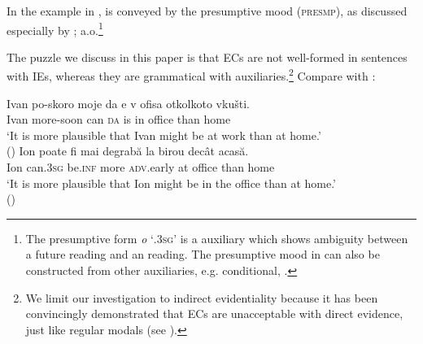 \documentclass[output=paper,colorlinks,citecolor=brown,newtxmath]{langsci/langscibook}
\begin{document}
In the  example in ,  is conveyed by the presumptive mood (\textsc{presmp}), as discussed especially by \citet{slavel56,cos76,reinhrip00,squ01,iri10,iri18}; a.o.\footnote{The  presumptive form \textit{o} `\textsc{.3sg}' is a  auxiliary which shows ambiguity between a  future reading and an  reading. The presumptive mood in  can also be constructed from other  auxiliaries, e.g. conditional, .\label{fn:presmp}}

\largerpage[2]
The puzzle we discuss in this paper is that ECs are not well-formed in sentences with IEs, whereas they are grammatical with  auxiliaries.\footnote{We limit our investigation to indirect evidentiality because it has been convincingly demonstrated that ECs are unacceptable with direct evidence, just like regular  modals (see \citealt{herrub14}).}
Compare  with :

	\ea \label{mobs1}  \label{IllformedECwithIIE}
	\newpage
 \label{IllformedECwithIIERom}
    \z \z

    \ea \label{mobs2} \ea \gll Ivan po-skoro moje da e 	v	ofisa	otkolkoto vkušti.   \\
    Ivan	more-soon
  can \textsc{da} is 	in	office	than home \\
      \glt  `It is more plausible that Ivan might be at work than at home.'\\\xspace\hfill ()
	\ex \gll Ion	poate 	fi		mai	degrabă	la 	birou decât acasă.\\
	Ion 	can.\textsc{3sg}	be.\textsc{inf}	more \textsc{adv}.early at office than home \\
	\glt `It is more plausible that Ion might be in the office than at home.'\\\xspace\hfill ()
	\z \z
\end{document}
